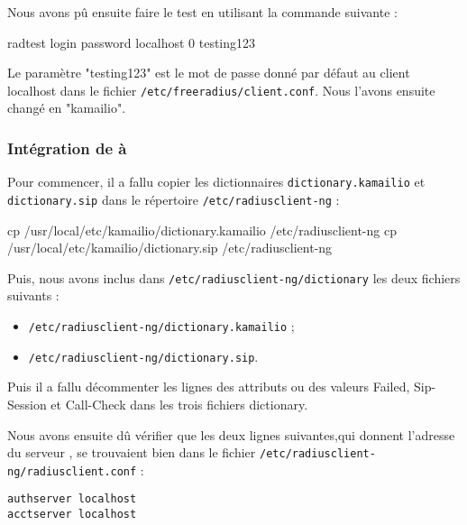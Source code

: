 Nous avons pû ensuite faire le test en utilisant la commande suivante :

\begin{shellcode}
radtest login password localhost 0 testing123
\end{shellcode}

Le paramètre "testing123" est le mot de passe donné par défaut au client localhost dans le fichier \texttt{/etc/freeradius/client.conf}. Nous l'avons ensuite changé en "kamailio".

\subsubsection{Intégration de {\rad} à {\kam}}

Pour commencer, il a fallu copier les dictionnaires \texttt{dictionary.kamailio} et \texttt{dictionary.sip} dans le répertoire \texttt{/etc/radiusclient-ng} :

\begin{shellcode}
cp /usr/local/etc/kamailio/dictionary.kamailio /etc/radiusclient-ng
cp /usr/local/etc/kamailio/dictionary.sip /etc/radiusclient-ng
\end{shellcode}

Puis, nous avons inclus dans \texttt{/etc/radiusclient-ng/dictionary} les deux fichiers suivants :

\begin{itemize}
\item{\texttt{/etc/radiusclient-ng/dictionary.kamailio} ;}
\item{\texttt{/etc/radiusclient-ng/dictionary.sip}.}
\end{itemize}

Puis il a fallu décommenter les lignes des attributs ou des valeurs Failed, Sip-Session et Call-Check dans les trois fichiers dictionary.

Nous avons ensuite dû vérifier que les deux lignes suivantes,qui donnent l'adresse du serveur {\rad}, se trouvaient bien dans le fichier \texttt{/etc/radiusclient-ng/radiusclient.conf} :

\begin{verbatim}
authserver localhost
acctserver localhost
\end{verbatim}

